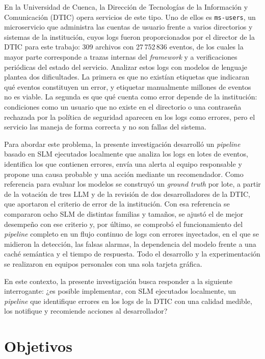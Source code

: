 En la Universidad de Cuenca, la Dirección de Tecnologías de la Información y Comunicación (DTIC) opera servicios de este tipo. Uno de ellos es \texttt{ms-users}, un microservicio que administra las cuentas de usuario frente a varios directorios y sistemas de la institución, cuyos logs fueron proporcionados por el director de la DTIC para este trabajo: 309 archivos con 27\,752\,836 eventos, de los cuales la mayor parte corresponde a trazas internas del \textit{framework} y a verificaciones periódicas del estado del servicio. Analizar estos logs con modelos de lenguaje plantea dos dificultades. La primera es que no existían etiquetas que indicaran qué eventos constituyen un error, y etiquetar manualmente millones de eventos no es viable. La segunda es que qué cuenta como error depende de la institución: condiciones como un usuario que no existe en el directorio o una contraseña rechazada por la política de seguridad aparecen en los logs como errores, pero el servicio las maneja de forma correcta y no son fallas del sistema.

Para abordar este problema, la presente investigación desarrolló un \textit{pipeline} basado en SLM ejecutados localmente que analiza los logs en lotes de eventos, identifica los que contienen errores, envía una alerta al equipo responsable y propone una causa probable y una acción mediante un recomendador. Como referencia para evaluar los modelos se construyó un \textit{ground truth} por lote, a partir de la votación de tres LLM y de la revisión de dos desarrolladores de la DTIC, que aportaron el criterio de error de la institución. Con esa referencia se compararon ocho SLM de distintas familias y tamaños, se ajustó el de mejor desempeño con ese criterio y, por último, se comprobó el funcionamiento del \textit{pipeline} completo en un flujo continuo de logs con errores inyectados, en el que se midieron la detección, las falsas alarmas, la dependencia del modelo frente a una caché semántica y el tiempo de respuesta. Todo el desarrollo y la experimentación se realizaron en equipos personales con una sola tarjeta gráfica.

En este contexto, la presente investigación busca responder a la siguiente interrogante: ¿es posible implementar, con SLM ejecutados localmente, un \textit{pipeline} que identifique errores en los logs de la DTIC con una calidad medible, los notifique y recomiende acciones al desarrollador?

\section{Objetivos}\label{sec:objetivos}

